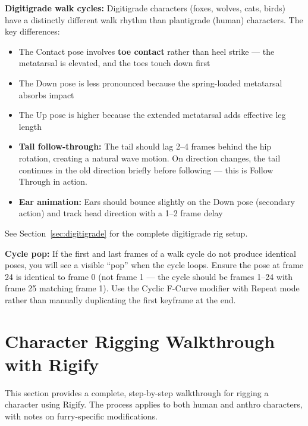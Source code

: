 \begin{furrybox}
\textbf{Digitigrade walk cycles:} Digitigrade characters (foxes, wolves, cats, birds) have a distinctly different walk rhythm than plantigrade (human) characters. The key differences:

\begin{itemize}[leftmargin=1.5em]
  \item The Contact pose involves \textbf{toe contact} rather than heel strike --- the metatarsal is elevated, and the toes touch down first
  \item The Down pose is less pronounced because the spring-loaded metatarsal absorbs impact
  \item The Up pose is higher because the extended metatarsal adds effective leg length
  \item \textbf{Tail follow-through:} The tail should lag 2--4 frames behind the hip rotation, creating a natural wave motion. On direction changes, the tail continues in the old direction briefly before following --- this is Follow Through in action.
  \item \textbf{Ear animation:} Ears should bounce slightly on the Down pose (secondary action) and track head direction with a 1--2 frame delay
\end{itemize}

See Section~\ref{sec:digitigrade} for the complete digitigrade rig setup.
\end{furrybox}

\begin{warningbox}
\textbf{Cycle pop:} If the first and last frames of a walk cycle do not produce identical poses, you will see a visible ``pop'' when the cycle loops. Ensure the pose at frame 24 is identical to frame 0 (not frame 1 --- the cycle should be frames 1--24 with frame 25 matching frame 1). Use the Cyclic F-Curve modifier with Repeat mode rather than manually duplicating the first keyframe at the end.
\end{warningbox}


\section{Character Rigging Walkthrough with Rigify}
\label{sec:rigging-walkthrough}

This section provides a complete, step-by-step walkthrough for rigging a character using Rigify. The process applies to both human and anthro characters, with notes on furry-specific modifications.

